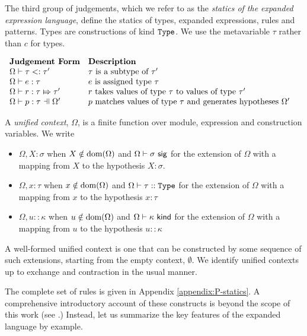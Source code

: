 The third group of judgements, which we refer to as the \emph{statics of the expanded expression language}, define the statics of types, expanded expressions, rules and patterns. Types are constructions of kind $\texttt{Type}$. We use the metavariable $\tau$ rather than $c$ for types.

\vspace{5px}
$\begin{array}{ll}
\textbf{Judgement Form} & \textbf{Description}\\
\issubtypePX{\tau}{\tau'} & \text{$\tau$ is a subtype of $\tau'$}\\
\hastypeP{\Omega}{e}{\tau} & \text{$e$ is assigned type $\tau$}\\
\ruleTypeP{\Omega}{r}{\tau}{\tau'} & \text{$r$ takes values of type $\tau$ to values of type $\tau'$}\\
\patTypeP{\Omega'}{p}{\tau} & \text{$p$ matches values of type $\tau$ and generates hypotheses $\Omega'$} 
\end{array}$
\vspace{5px}


A \emph{unified context}, $\Omega$, is a finite function over module, expression and construction variables. 
We write
\begin{itemize}
\item $\Omega, X : \sigma$ when $X \notin \text{dom}(\Omega)$ and $\Omega \vdash \sigma~\mathsf{sig}$ for the extension of $\Omega$ with a mapping from $X$ to the hypothesis $X : \sigma$.
\item $\Omega, x : \tau$ when $x \notin \text{dom}(\Omega)$ and $\Omega \vdash \tau :: \texttt{Type}$ for the extension of $\Omega$ with a mapping from $x$ to the hypothesis $x : \tau$
\item $\Omega, u :: \kappa$ when $u \notin \text{dom}(\Omega)$ and $\Omega \vdash \kappa~\mathsf{kind}$ for the extension of $\Omega$ with a mapping from $u$ to the hypothesis $u :: \kappa$
\end{itemize}
A well-formed unified context is one that can be constructed by some sequence of such extensions, starting from the empty context, $\emptyset$. We identify unified contexts up to exchange and contraction in the usual manner.

The complete set of rules is given in Appendix \ref{appendix:P-statics}. A comprehensive introductory account of these constructs is beyond the scope of this work (see \cite{pfpl}.) Instead, let us summarize the key features of the expanded language by example. 

